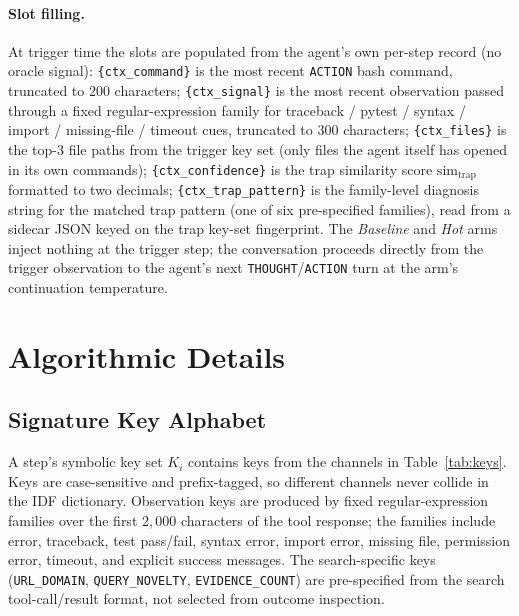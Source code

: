 \paragraph{Slot filling.}
At trigger time the slots are populated from the agent's own per-step record (no oracle signal):
\verb|{ctx_command}| is the most recent \texttt{ACTION} bash command, truncated to $200$ characters;
\verb|{ctx_signal}| is the most recent observation passed through a fixed regular-expression family for traceback / pytest / syntax / import / missing-file / timeout cues, truncated to $300$ characters;
\verb|{ctx_files}| is the top-$3$ file paths from the trigger key set (only files the agent itself has opened in its own commands);
\verb|{ctx_confidence}| is the trap similarity score $\mathrm{sim}_{\mathrm{trap}}$ formatted to two decimals;
\verb|{ctx_trap_pattern}| is the family-level diagnosis string for the matched trap pattern (one of six pre-specified families), read from a sidecar JSON keyed on the trap key-set fingerprint.
The \emph{Baseline} and \emph{Hot} arms inject nothing at the trigger step; the conversation proceeds directly from the trigger observation to the agent's next \texttt{THOUGHT}/\texttt{ACTION} turn at the arm's continuation temperature.

\section{Algorithmic Details}
\label{app:algos}


\subsection{Signature Key Alphabet}
\label{app:keys}

A step's symbolic key set $K_i$ contains keys from the channels in Table~\ref{tab:keys}.
Keys are case-sensitive and prefix-tagged, so different channels never collide in the IDF dictionary.
Observation keys are produced by fixed regular-expression families over the first $2{,}000$ characters of the tool response; the families include error, traceback, test pass/fail, syntax error, import error, missing file, permission error, timeout, and explicit success messages.
The search-specific keys (\texttt{URL\_DOMAIN}, \texttt{QUERY\_NOVELTY}, \texttt{EVIDENCE\_COUNT}) are pre-specified from the search tool-call/result format, not selected from outcome inspection.

